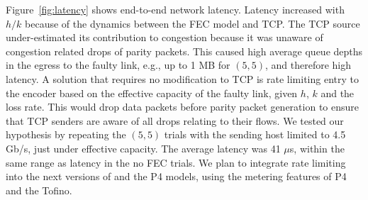 Figure~\ref{fig:latency} shows end-to-end network latency. Latency increased
with $h/k$ because of the dynamics between the FEC model and TCP. The TCP
source under-estimated its contribution to congestion because it was unaware
of congestion related drops of parity packets. This caused high average queue
depths in the egress to the faulty link, e.g., up to 1 MB for $(5,5)$, and
therefore high latency. A solution that requires no modification to TCP is
rate limiting entry to the encoder based on the effective capacity of the
faulty link, given $h$, $k$ and the loss rate. This would drop data packets
before parity packet generation to ensure that TCP senders are aware of  all
drops relating to their flows. We tested our hypothesis by repeating the $(5,
5)$ trials with the sending host limited to 4.5 Gb/s, just under effective
capacity. The average latency was 41 $\mu$s, within the same range as latency
in the no FEC trials. We plan to integrate rate limiting into the next
versions of \OurSys and the P4 models, using the metering features of P4 and
the Tofino.


